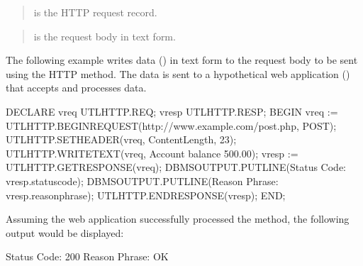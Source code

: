 \documentclass[letterpaper,10pt,english,openany,oneside]{sphinxmanual}
\begin{document}

\begin{quote}

 is the HTTP request record.
\end{quote}

\begin{quote}

 is the request body in text form.
\end{quote}


The following example writes data () in text form
to the request body to be sent using the HTTP  method. The data is
sent to a hypothetical web application () that accepts and
processes data.

%
\begin{sphinxVerbatim}[commandchars=\\\{\}]
DECLARE
    v\PYGZus{}req           UTL\PYGZus{}HTTP.REQ;
    v\PYGZus{}resp          UTL\PYGZus{}HTTP.RESP;
BEGIN
    v\PYGZus{}req := UTL\PYGZus{}HTTP.BEGIN\PYGZus{}REQUEST(\PYGZsq{}http://www.example.com/post.php\PYGZsq{},
       \PYGZsq{}POST\PYGZsq{});
    UTL\PYGZus{}HTTP.SET\PYGZus{}HEADER(v\PYGZus{}req, \PYGZsq{}Content\PYGZhy{}Length\PYGZsq{}, \PYGZsq{}23\PYGZsq{});
    UTL\PYGZus{}HTTP.WRITE\PYGZus{}TEXT(v\PYGZus{}req, \PYGZsq{}Account balance \PYGZdl{}500.00\PYGZsq{});
    v\PYGZus{}resp := UTL\PYGZus{}HTTP.GET\PYGZus{}RESPONSE(v\PYGZus{}req);
    DBMS\PYGZus{}OUTPUT.PUT\PYGZus{}LINE(\PYGZsq{}Status Code: \PYGZsq{} \textbar{}\textbar{} v\PYGZus{}resp.status\PYGZus{}code);
    DBMS\PYGZus{}OUTPUT.PUT\PYGZus{}LINE(\PYGZsq{}Reason Phrase: \PYGZsq{} \textbar{}\textbar{} v\PYGZus{}resp.reason\PYGZus{}phrase);
    UTL\PYGZus{}HTTP.END\PYGZus{}RESPONSE(v\PYGZus{}resp);
END;
\end{sphinxVerbatim}

Assuming the web application successfully processed the  method, the
following output would be displayed:

%
\begin{sphinxVerbatim}[commandchars=\\\{\}]
Status Code: 200
Reason Phrase: OK
\end{sphinxVerbatim}
\end{document}
